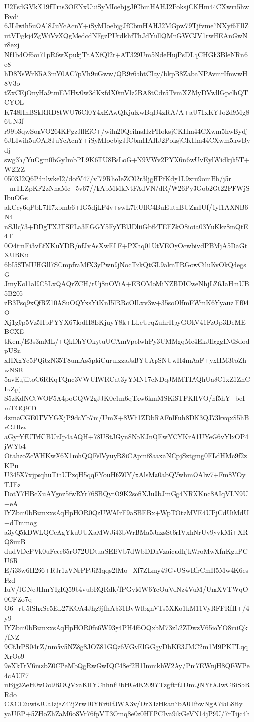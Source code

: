 U2FsdGVkX19fTms3OENxUuiSyMIoebjgJfCbmHAHJ2PoksjCKHm44CXwm5hwBydj
6JLIwih5uOAl8JuYcAcnY+iSyMIoebjgJfCbmHAHJ2MGpw79Tjfvme7NXyf5FllZ
utVDgkj4ZgWiVvXQgMedcdNFgzPUrdkhfThJdYullQMnGWCJV1rwHEAnGwNr8exj
Nf1bdOf6or71pR6wXpukjTtAXfQl2r+AT329Um5NdeHujPsDLqCHGh3BleNRn6e8
hD8NsWrK5A3mV0AC7pVh9uGww/QR9r6ohtCIay/bkpB8ZabnNPAvmrIfmvwH8V3o
tZxCEjOnyHa9tmEMHw0w3dKxfdX0mVlz2BA8tCdr5TvmXZMyDVwllGpclhQTCYOL
K748HnBSkRRD8tWU76Cl0Y4xEAwQKjuKwBqI94zRA/A+aU71xKYJo2d9Mg86UN3f
r99bSqwSonVO264KPgz0flEiC+/wiln20QeiInsHzPHoksjCKHm44CXwm5hwBydj
6JLIwih5uOAl8JuYcAcnY+iSyMIoebjgJfCbmHAHJ2PoksjCKHm44CXwm5hwBydj
swg3h/YuOgm0bGyImbPL9K6TU8BsLoG+N9VWv2PYX6n6wUvEylWidkjb5T+W2iZZ
0503J2Q6PdnlwkeI2/dofV47/vI79RhoIeZC02r3ljgHPfKdy1L9zru9omBh/j5r
+mTLZpKF2zNhaMc+5v67//kAbMMkNtFAdVN/dR/W26Py3Gob2Gt22PFWjSIbuOGs
akCcy6qPbL7H7xbmb6+IG5djLF4v+swL7RUflC4BuEutnBUZmIUf/1yl1AXNB6N4
nSJlq73+DDgTXJTSFLa3EGGY5FyYBlJDliiGbfkTEFZkO8iota03YuKkz8mQtE4T
0O4tmFi3vEfXKuYDB/nfJvAeXwELF+PXhq01UtVEOyOcwbivdPBMjA5DaGtXURKu
6bI5STeIUHGll7SCmpfraMfX3yPwn9jNocTxkQtGL9aknTRGowCiluKvOkQdegsG
JmyKol1al9C5LxQAQrZCH/rUj8nOViA+EBOMoMiNZBDICweNhjLZ6JaHmUB5B205
zB3Psq9xQfRZ10ASuOQYxsYtKnI5lRRcOlLxv3w+35soOlfmFWmK6YyauziFf04O
Xj1g0p5Vz5HbPYYX67IodH8BKjuyY8k+LLeUrqZuhrHpyGOkV41FzOp3DoMEBCXE
tKem/E3s3mML/+QkDhYOkytuUCAmVpolwhPy3UMMgqMe4EkJIlcggIN0SdodpUSn
xHXxYc5PQitzN35T8umAs5pkiCuruIzzaJsBYUApSNUwH4mAaF+yxHM30oZhwNSB
5avEujiitoC6RKqTQnc3VWUIWRCdt3yYMN17cNDqJMMTIAQhUa8C1xZ1ZnCIxZpj
S5zKdNCtWOF5A4poGQW2gJJK0c1m6qTxw6kmMSKiSTFKHVO/hf5hY+beImTOQ9iD
4zmaCGE0TVYGXjP9dcYb7m/UmX+8Wb1ZDbRAFnlFuh8DK3QJ73kvqxS5hBrGJIbw
aGyrYfUTrKlBUrJp4aAQH+78UStJGyn8NoKJnQEwYCYKrA1UYeG6vYlxOP4jWYb4
OtahzoZcWHKwX6X1mhQQFelVyuyR8iCApmf8aaxaNCpjSztgmg0FLdHMo9f2zKPu
U345X7xjpsqhuTinUPzqH5qqFYouH6Z0Y/xAlsMa0abQVwhmOAlw7+Fm8VOyTJEz
DotY7HBcXuAYgnz5fwRYr76SBQytO9K2sofiXJu0bJmGg4NRXKnc8AIqVLN9U+eA
lYZbm0bBzmxxsAqHpHOR0QzUWAIrF9aSBEBx+WpTOtzMVE4UPjCdUiMdU+dTmmog
a3yQ5kDWLQCcAgYkuUUXaMWJi43bWrBMa5JnzsSt6rIVxhNrUv9yvkMi+XRQ8uuB
dudVDcPVk0uFecc65rO72UDtuaSEBVb7dWbDDhVzaicudhjkWroMwXfnKguPCU6R
E/i38w6H266+RJr1zVNrPPJiMqqs2tMo+Xf7ZLmy49GvUSwBfrCmH5Mw4K6esFzd
IuV/IGNeJHmYIgIQ59b4vubRQRdk/fPGvMW6YcOuVoNz4VuM/UmXVTWqO0CFZo7q
O6+rU5lShxSc5EL27KOA4Jhg9jfhAb31BvWlbgnVTs5XKo1kM11VyRFFRfH+/4y9
lYZbm0bBzmxxsAqHpHOR0fn6W93y4PH4f6OQxbM73zL2ZDwzV65ioYO8miQk/fNZ
9CfJrPS04nZ/nm5v5NZ8g8JOZ81GQz6VGvElGGgyDbKE3JMC2m1M9PKTLqqXrOo9
9eXkTrV6mzbZ0CPeMbQgRwGwIQC48ef2H1ImmkhW2Ay/Pm7EWnjH8QEWPe4cAUF7
uBjg3ZeH0wOo9ROQVxaKlIYChhnfUbHGdK209YTzgftrfJDmQNYtAJwCBiS5RRdo
CXC12uwisJCaIzjeZ42jZrw10YRr6IfJWX3v/DrXIzHkan7bA01f5wNgA7i5L8By
yaUEP+5ZHoZhZaM6oSVr76fpVT3Omq8e0z0HFPCIva9ikGeVN14jP9U/7rTijc4h
